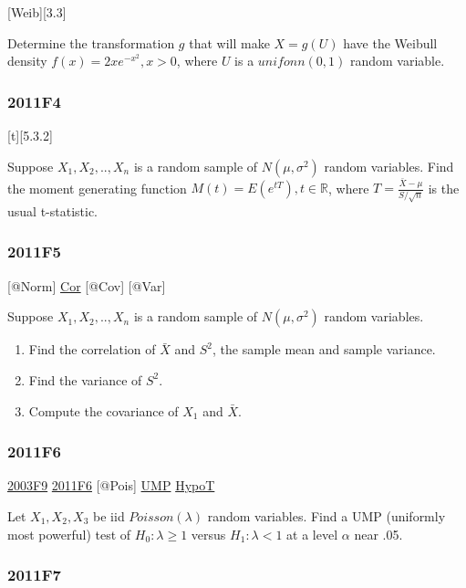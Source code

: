 \documentclass[10pt,twocolumn,portrait]{article}
\begin{document}
{[}Weib{]}{[}3.3{]}

Determine the transformation \(g\) that will make \(X=g(U)\) have the
Weibull density \(f(x)=2xe^{-x^2},x>0\), where \(U\) is a
\(unifonn(0,1)\) random variable.

\hypertarget{f4-4}{%
\subsubsection{2011F4}\label{f4-4}}

{[}t{]}{[}5.3.2{]}

Suppose \(X_1,X_2,..,X_{n}\) is a random sample of \(N(\mu,\sigma^2)\)
random variables. Find the moment generating function
\(M(t)=E(e^{tT}),t\in\mathbb R\), where
\(T=\frac{\bar X-\mu}{S/\sqrt{n}}\) is the usual t-statistic.

\hypertarget{f5-4}{%
\subsubsection{2011F5}\label{f5-4}}

{[}@Norm{]} \protect\hyperlink{Cor}{Cor} {[}@Cov{]} {[}@Var{]}

Suppose \(X_1,X_2,..,X_{n}\) is a random sample of \(N(\mu,\sigma^2)\)
random variables.

\begin{enumerate}
\def\labelenumi{(\alph{enumi})}
\item
  Find the correlation of \(\bar X\) and \(S^2\), the sample mean and
  sample variance.
\item
  Find the variance of \(S^2\).
\item
  Compute the covariance of \(X_1\) and \(\bar X\).
\end{enumerate}

\hypertarget{f6-4}{%
\subsubsection{2011F6}\label{f6-4}}

\protect\hyperlink{f9-1}{2003F9} \protect\hyperlink{f6-4}{2011F6}
{[}@Pois{]} \protect\hyperlink{section-7}{UMP}
\protect\hyperlink{HypoT}{HypoT}

Let \(X_1,X_2,X_3\) be iid \(Poisson(\lambda)\) random variables. Find a
UMP (uniformly most powerful) test of \(H_0:\lambda\ge1\) versus
\(H_1:\lambda<1\) at a level \(\alpha\) near .05.

\hypertarget{f7-4}{%
\subsubsection{2011F7}\label{f7-4}}
\end{document}
